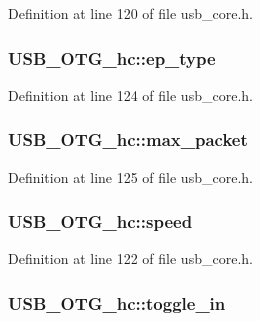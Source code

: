 Definition at line 120 of file usb\-\_\-core.\-h.

\hypertarget{struct_u_s_b___o_t_g__hc_a66a16a1ca10dff9b47cde3a65fa638e9}{
\subsubsection[{ep\-\_\-type}]{ U\-S\-B\-\_\-\-O\-T\-G\-\_\-hc\-::ep\-\_\-type}}\label{struct_u_s_b___o_t_g__hc_a66a16a1ca10dff9b47cde3a65fa638e9}


Definition at line 124 of file usb\-\_\-core.\-h.

\hypertarget{struct_u_s_b___o_t_g__hc_a685591cbf9208cc10a5b576a33655770}{
\subsubsection[{max\-\_\-packet}]{ U\-S\-B\-\_\-\-O\-T\-G\-\_\-hc\-::max\-\_\-packet}}\label{struct_u_s_b___o_t_g__hc_a685591cbf9208cc10a5b576a33655770}


Definition at line 125 of file usb\-\_\-core.\-h.

\hypertarget{struct_u_s_b___o_t_g__hc_ae645398ec19a1becfafd72797d54c07f}{
\subsubsection[{speed}]{ U\-S\-B\-\_\-\-O\-T\-G\-\_\-hc\-::speed}}\label{struct_u_s_b___o_t_g__hc_ae645398ec19a1becfafd72797d54c07f}


Definition at line 122 of file usb\-\_\-core.\-h.

\hypertarget{struct_u_s_b___o_t_g__hc_a95b90ad5659d70e73fc7d63f080ddd40}{
\subsubsection[{toggle\-\_\-in}]{ U\-S\-B\-\_\-\-O\-T\-G\-\_\-hc\-::toggle\-\_\-in}}\label{struct_u_s_b___o_t_g__hc_a95b90ad5659d70e73fc7d63f080ddd40}


